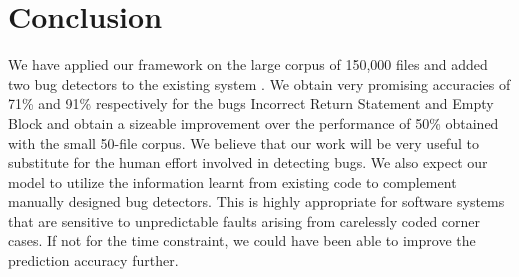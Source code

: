 \documentclass[sigconf]{acmart}
\begin{document}
\section{Conclusion}

We have applied our framework on the large corpus of 150,000 files and added two bug detectors to the existing system . We obtain very promising accuracies of
71\% and 91\% respectively for the bugs Incorrect Return Statement and Empty Block and obtain a sizeable improvement over the performance of 50\% obtained with the small 50-file corpus. We believe that our work will be very useful to substitute for the human effort involved in detecting bugs. We also expect our model to utilize the information learnt from existing code to complement manually designed bug detectors. This is highly appropriate for software systems that are sensitive to unpredictable faults arising from carelessly coded corner cases. If not for the time constraint, we could have been able to improve the prediction accuracy further.



\end{document}
